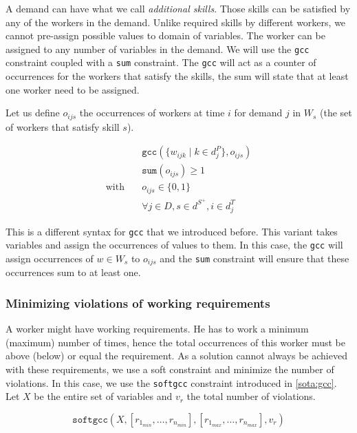 \documentclass[../../thesis.tex]{subfiles}
\begin{document}
A demand can have what we call \emph{additional skills}. Those skills can be 
satisfied by any of the workers in the demand. Unlike required skills by different workers,
we cannot pre-assign possible values to domain of variables. The worker can be assigned to any number of variables in the demand.
We will use the \texttt{gcc} constraint coupled with a \texttt{sum} constraint.
The \texttt{gcc} will act as a counter of occurrences for the workers that satisfy the skills,
the sum will state that at least one worker need to be assigned.

Let us define $o_{ijs}$ the occurrences of workers at time $i$ for demand $j$ in $W_s$ (the set of workers that satisfy skill $s$).

\begin{align}
  &\texttt{gcc}(\{ w_{ijk} \mid k \in d^P_j \}, o_{ijs}) \\ 
  &\texttt{sum}(o_{ijs}) \geq 1 \\
  \text{with} \quad & o_{ijs} \in \{ 0, 1 \} \\
  & \forall j \in D, s \in d^{S^{+}}, i \in d^T_j
\end{align}

This is a different syntax for \texttt{gcc} that we introduced before. This variant takes 
variables and assign the occurrences of values to them. In this case, the \texttt{gcc} will assign 
occurrences of $w \in W_s$ to $o_{ijs}$ and the \texttt{sum} constraint will ensure that 
these occurrences sum to at least one.

\subsubsection{Minimizing violations of working requirements}

A worker might have working requirements. He has to work a minimum (maximum) number of times, hence the total 
occurrences of this worker must be above (below) or equal the requirement. As a solution cannot always be 
achieved with these requirements, we use a soft constraint and minimize the number of violations. In this case,
we use the \texttt{softgcc} constraint introduced in \autoref{sota:gcc}. Let $X$ be the entire set of variables and 
$v_r$ the total number of violations.

\begin{equation}
  \texttt{softgcc}(X, [r_{1_{min}}, \dots, r_{n_{min}}], [r_{1_{max}}, \dots, r_{n_{max}}], v_{r}) \label{cp:wrequirements} 
\end{equation}
\end{document}
